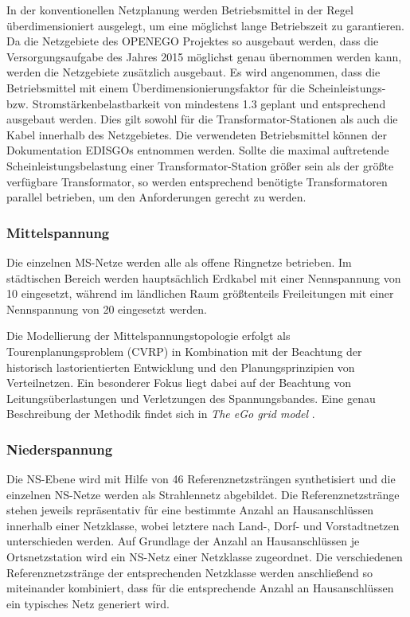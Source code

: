 In der konventionellen Netzplanung werden Betriebsmittel in der Regel überdimensioniert ausgelegt, um eine möglichst lange Betriebszeit zu garantieren.
Da die Netzgebiete des \gls{OPENEGO} Projektes so ausgebaut werden, dass die Versorgungsaufgabe des Jahres \num{2015} möglichst genau übernommen werden kann, werden die Netzgebiete zusätzlich ausgebaut.
Es wird angenommen, dass die Betriebsmittel mit einem Überdimensionierungsfaktor für die Scheinleistungs- bzw. Stromstärkenbelastbarkeit von mindestens \num{1.3} geplant und entsprechend ausgebaut werden.
Dies gilt sowohl für die Transformator-Stationen als auch die Kabel innerhalb des Netzgebietes.
Die verwendeten Betriebsmittel können der Dokumentation \glspl{EDISGO} \cite{edisgoDocs2017a} entnommen werden.
Sollte die maximal auftretende Scheinleistungsbelastung einer Transformator-Station größer sein als der größte verfügbare Transformator, so werden entsprechend benötigte Transformatoren parallel betrieben, um den Anforderungen gerecht zu werden.


\subsubsection{Mittelspannung}

Die einzelnen \gls{MS}-Netze werden alle als offene Ringnetze betrieben.
Im städtischen Bereich werden hauptsächlich Erdkabel mit einer Nennspannung von \SI{10}{\kv} eingesetzt, während im ländlichen Raum größtenteils Freileitungen mit einer Nennspannung von \SI{20}{\kv} eingesetzt werden. \cite{Mueller2019}\medskip

Die Modellierung der Mittelspannungstopologie erfolgt als Tourenplanungsproblem (\gls{CVRP}) in Kombination mit der Beachtung der historisch lastorientierten Entwicklung und den Planungsprinzipien von Verteilnetzen.
Ein besonderer Fokus liegt dabei auf der Beachtung von Leitungsüberlastungen und Verletzungen des Spannungsbandes.
Eine genau Beschreibung der Methodik findet sich in \textit{The eGo grid model} \cite{Amme2018}.


\subsubsection{Niederspannung}

Die \gls{NS}-Ebene wird mit Hilfe von \num{46} Referenznetzsträngen synthetisiert und die einzelnen \gls{NS}-Netze werden als Strahlennetz abgebildet.
Die Referenznetzstränge stehen jeweils repräsentativ für eine bestimmte Anzahl an Hausanschlüssen innerhalb einer Netzklasse, wobei letztere nach Land-, Dorf- und Vorstadtnetzen unterschieden werden.
Auf Grundlage der Anzahl an Hausanschlüssen je Ortsnetzstation wird ein \gls{NS}-Netz einer Netzklasse zugeordnet.
Die verschiedenen Referenznetzstränge der entsprechenden Netzklasse werden anschließend so miteinander kombiniert, dass für die entsprechende Anzahl an Hausanschlüssen ein typisches Netz generiert wird. \cite{Mueller2019}


